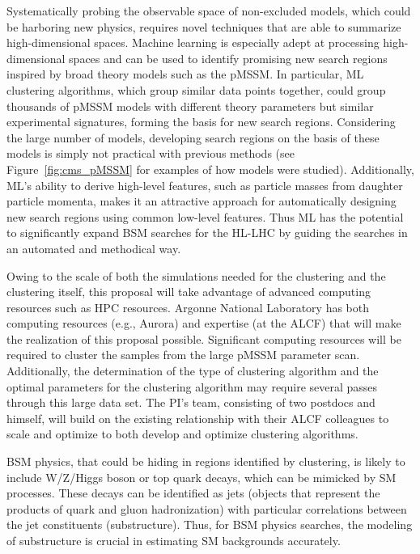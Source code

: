 \documentclass[letter, USenglish, 11pt, subfigure]{article}
\begin{document}
Systematically probing the observable space of non-excluded models, which could be harboring new physics, requires novel techniques that are able to summarize high-dimensional spaces. Machine learning is especially adept at processing high-dimensional spaces and can be used to identify promising new search regions inspired by broad theory models such as the pMSSM. In particular, ML clustering algorithms, which group similar data points together, could group thousands of pMSSM models with different theory parameters but similar experimental signatures, forming the basis for new search regions. Considering the large number of models, developing search regions on the basis of these models is simply not practical with previous methods (see Figure~\ref{fig:cms_pMSSM} for examples of how models were studied). Additionally, ML's ability to derive high-level features, such as particle masses from daughter particle momenta, makes it an attractive approach for automatically designing new search regions using common low-level features. Thus ML has the potential to significantly expand BSM searches for the HL-LHC by guiding the searches in an automated and methodical way.

Owing to the scale of both the simulations needed for the clustering and the clustering itself, this proposal will take advantage of advanced computing resources such as HPC resources. Argonne National Laboratory has both computing resources (e.g., Aurora) and expertise (at the ALCF) that will make the realization of this proposal possible. Significant computing resources will be required to cluster the samples from the large pMSSM parameter scan. Additionally, the determination of the type of clustering algorithm and the optimal parameters for the clustering algorithm may require several passes through this large data set. The PI's team, consisting of two postdocs and himself, will build on the existing relationship with their ALCF colleagues to scale and optimize to both develop and optimize clustering algorithms.

BSM physics, that could be hiding in regions identified by clustering, is likely to include W/Z/Higgs boson or top quark decays, which can be mimicked by SM processes. These decays can be identified as jets (objects that represent the products of quark and gluon hadronization) with particular correlations between the jet constituents (substructure). Thus, for BSM physics searches, the modeling of substructure is crucial in estimating SM backgrounds accurately.
\end{document}
